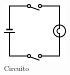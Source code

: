 \begin{frame}
\begin{columns}
		\begin{figure}[!htbp]
			\centering 
			\includegraphics[width=0.85\linewidth]{images/2_elettronica/logic_gate_circuit_and.png}
			\caption{Circuito}
		\end{figure}
		
	\end{columns}
	
\end{frame}


